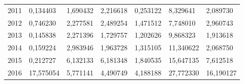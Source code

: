 \begin{table}
\begin{tabular}{p{1cm}p{2cm}p{2cm}p{2cm}p{2cm}p{2cm}p{2cm}}
 2011 &                               0,134403 &        1,690432 &     2,216618 &             0,253122 &          8,329641 &                       2,089730 \\
 2012 &                               0,746230 &        2,277581 &     2,489254 &             1,471512 &          7,748010 &                       2,960743 \\
 2013 &                               0,145838 &        2,271396 &     1,729757 &             1,202626 &          9,868323 &                       1,913618 \\
 2014 &                               0,159224 &        2,983946 &     1,963728 &             1,315105 &         11,340622 &                       2,068750 \\
 2015 &                               0,212727 &        6,132133 &     6,181348 &             1,840535 &         15,647135 &                       7,612518 \\
 2016 &                              17,575054 &        5,771141 &     4,490749 &             4,188188 &         27,772330 &                      16,190127 \\
\bottomrule
\end{tabular}
\end{table}
